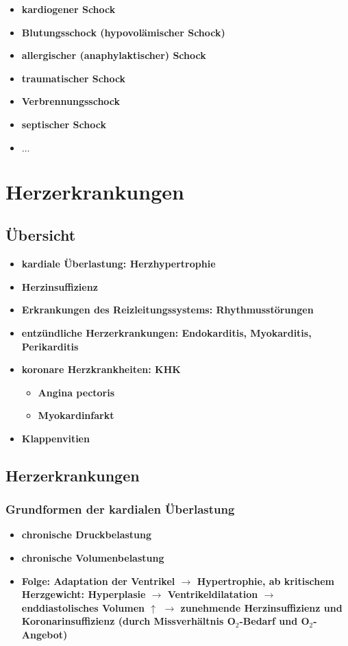 \begin{itemize}
				\begin{itemize}
					\item \textbf{kardiogener Schock}
					\item \textbf{Blutungsschock (hypovolämischer Schock)}
					\item \textbf{allergischer (anaphylaktischer) Schock}
					\item \textbf{traumatischer Schock}
					\item \textbf{Verbrennungsschock}
					\item \textbf{septischer Schock}
					\item \textbf{$\dots$}
				\end{itemize}
		\end{itemize}
		
\section*{Herzerkrankungen}
	\subsection*{Übersicht}
		\begin{itemize}
			\item \textbf{kardiale Überlastung: Herzhypertrophie}
			\item \textbf{Herzinsuffizienz}
			\item \textbf{Erkrankungen des Reizleitungssystems: Rhythmusstörungen}
			\item \textbf{entzündliche Herzerkrankungen: Endokarditis, Myokarditis, Perikarditis}
			\item \textbf{koronare Herzkrankheiten: KHK}
				\begin{itemize}
					\item \textbf{Angina pectoris}
					\item \textbf{Myokardinfarkt}
				\end{itemize}
			\item \textbf{Klappenvitien}
		\end{itemize}
	\subsection*{Herzerkrankungen}
		\subsubsection*{Grundformen der kardialen Überlastung}
			\begin{itemize}
				\item \textbf{chronische Druckbelastung}
				\item \textbf{chronische Volumenbelastung}
				\item \textbf{Folge: Adaptation der Ventrikel  $\rightarrow$  Hypertrophie, ab kritischem Herzgewicht: Hyperplasie  $\rightarrow$ Ventrikeldilatation  $\rightarrow$  enddiastolisches Volumen $\uparrow$ $\rightarrow$  zunehmende Herzinsuffizienz und Koronarinsuffizienz (durch Missverhältnis O$_2$-Bedarf und  O$_2$-Angebot) }
			\end{itemize}
